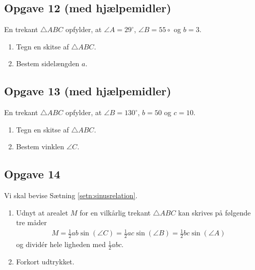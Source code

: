 \subsection*{Opgave 12 (med hjælpemidler)}
En trekant $\triangle ABC$ opfylder, at $\angle A = 29^\circ$, $\angle B = 55\circ$ og $b = 3$.
\begin{enumerate}[label=\roman*)]
	\item Tegn en skitse af $\triangle ABC$. 
	\item Bestem sidelængden $a$.
\end{enumerate}

\subsection*{Opgave 13 (med hjælpemidler)}
En trekant $\triangle ABC$ opfylder, at $\angle B = 130^\circ$, $b = 50$ og $c = 10$.
\begin{enumerate}[label=\roman*)	]
	\item Tegn en skitse af $\triangle ABC$. 
	\item Bestem vinklen $\angle C$. 
\end{enumerate}

\subsection*{Opgave 14}
Vi skal bevise Sætning \ref{setn:sinusrelation}.
\begin{enumerate}[label=\roman*)]
	\item Udnyt at arealet $M$ for en vilkårlig trekant $\triangle ABC$ kan skrives på følgende tre måder
	\begin{align*}
		M = \frac{1}{2}ab\sin(\angle C) = \frac{1}{2}ac\sin(\angle B) = \frac{1}{2} bc\sin(\angle A)
	\end{align*}
	og dividér hele ligheden med $\frac{1}{2}abc$.
	\item Forkort udtrykket.
\end{enumerate}